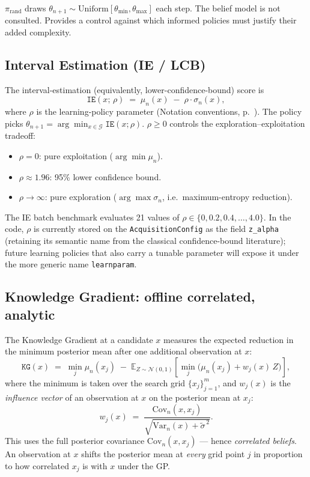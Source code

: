 \documentclass[11pt]{article}
\newcommand{\Normal}{\mathcal{N}}
\newcommand{\Ex}{\mathbb{E}}
\newcommand{\Var}{\mathrm{Var}}
\newcommand{\Cov}{\mathrm{Cov}}
\newcommand{\Cstar}{\theta}
\newcommand{\muN}{\mu_n}
\newcommand{\sigN}{\sigma_n}
\newcommand{\sigTilde}{\tilde{\sigma}}
\newcommand{\code}[1]{\texttt{#1}}
\begin{document}
$\pi_{\mathrm{rand}}$ draws $\Cstar_{n+1} \sim \mathrm{Uniform}[\Cstar_{\min},
\Cstar_{\max}]$ each step. The belief model is not consulted. Provides a
control against which informed policies must justify their added complexity.

\subsection{Interval Estimation (IE / LCB)}
\label{sec:policies:ie}

The interval-estimation (equivalently, lower-confidence-bound) score is
\begin{equation}
  \code{IE}(x;\, \rho) \;=\; \muN(x) \;-\; \rho \cdot \sigN(x),
  \label{eq:ie-lcb}
\end{equation}
where $\rho$ is the learning-policy parameter (Notation conventions,
p.~\pageref{sec:overview}). The policy picks
$\theta_{n+1} = \arg\min_{x \in \mathcal{G}} \code{IE}(x;\rho)$.
$\rho \geq 0$ controls the exploration--exploitation tradeoff:
\begin{itemize}[nosep]
  \item $\rho = 0$: pure exploitation ($\arg\min \muN$).
  \item $\rho \approx 1.96$: 95\% lower confidence bound.
  \item $\rho \to \infty$: pure exploration ($\arg\max \sigN$, i.e.\
    maximum-entropy reduction).
\end{itemize}
The IE batch benchmark evaluates 21 values of $\rho \in \{0, 0.2, 0.4,
\dots, 4.0\}$. In the code, $\rho$ is currently stored on the
\code{AcquisitionConfig} as the field \code{z\_alpha} (retaining its
semantic name from the classical confidence-bound literature); future
learning policies that also carry a tunable parameter will expose it
under the more generic name \code{learnparam}.

\subsection{Knowledge Gradient: offline correlated, analytic}
\label{sec:policies:kg-analytic}

The Knowledge Gradient at a candidate $x$ measures the expected reduction
in the minimum posterior mean after one additional observation at $x$:
\begin{equation}
  \code{KG}(x) \;=\; \min_j \muN(x_j) \;-\; \Ex_{Z \sim \Normal(0,1)}\!\left[\min_j \bigl(\muN(x_j) + w_j(x)\,Z\bigr)\right],
  \label{eq:kg-def}
\end{equation}
where the minimum is taken over the search grid $\{x_j\}_{j=1}^m$, and
$w_j(x)$ is the \emph{influence vector} of an observation at $x$ on the
posterior mean at $x_j$:
\begin{equation}
  w_j(x) \;=\; \frac{\Cov_n(x, x_j)}{\sqrt{\Var_n(x) + \sigTilde^{\,2}}}.
  \label{eq:influence}
\end{equation}
This uses the full posterior covariance $\Cov_n(x, x_j)$ — hence
\emph{correlated beliefs}. An observation at $x$ shifts the posterior mean
at \emph{every} grid point $j$ in proportion to how correlated $x_j$ is
with $x$ under the GP.
\end{document}
